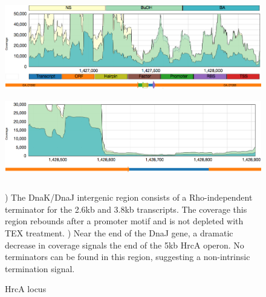 \begin{figure}
\small
{\includegraphics[width=\textwidth,height=1.5in]{images/Assembly/Examples/HrcA/DnaKJ-IGR.png}
\label{fig:9a}}
{\includegraphics[width=\textwidth,height=1.5in]{images/Assembly/Examples/HrcA/HrcA-termination.png}
\label{fig:9b}}
\caption{HrcA locus}
) The DnaK/DnaJ intergenic region consists of a Rho-independent terminator for the 2.6kb and 3.8kb transcripts. The coverage this region rebounds after a promoter motif and is not depleted with TEX treatment. ) Near the end of the DnaJ gene, a dramatic decrease in coverage signals the end of the 5kb HrcA operon. No terminators can be found in this region, suggesting a non-intrinsic termination signal.
\end{figure}


